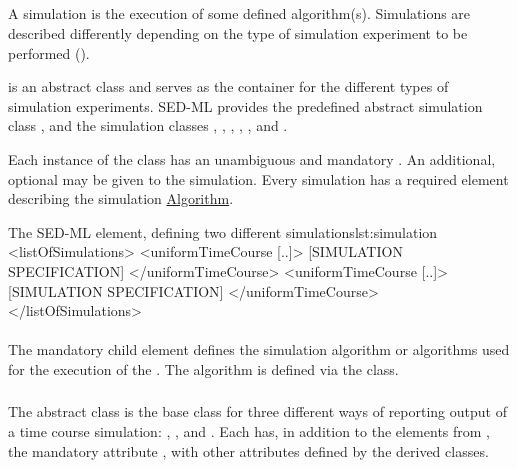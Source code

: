 \subsection{}
\label{class:simulation}
A simulation is the execution of some defined algorithm(s). Simulations are described differently depending on the type of simulation experiment to be performed (). 


\Simulation is an abstract class and serves as the container for the different types of simulation experiments. SED-ML \currentLV provides the predefined abstract simulation class \TimeCourse, and the simulation classes \UniformTimeCourse, \NonUniformTimeCourse, \SpecificTimeCourse, \OneStep, \SteadyState, and \Analysis. 

Each instance of the \Simulation class has an unambiguous and mandatory \hyperref[sec:id]{}. An additional, optional \hyperref[sec:name]{} may be given to the simulation. Every simulation has a required element \hyperref[class:algorithm]{} describing the simulation \hyperref[class:algorithm]{Algorithm}.

\begin{myXmlLst}{The SED-ML  element, defining two different \UniformTimeCourse simulations}{lst:simulation}
<listOfSimulations>
	<uniformTimeCourse [..]>
		[SIMULATION SPECIFICATION]
	</uniformTimeCourse>
	<uniformTimeCourse [..]>
		[SIMULATION SPECIFICATION]
	</uniformTimeCourse>
</listOfSimulations>
\end{myXmlLst}

\paragraph*{}
\label{sec:sim-algorithm}
The mandatory child  element defines the simulation algorithm or algorithms used for the execution of the \Simulation. The algorithm is defined via the \Algorithm class.

\begin{blockChanged}
\subsubsection{}
\label{class:timeCourse}
The abstract \TimeCourse class is the base class for three different ways of reporting output of a time course simulation: \UniformTimeCourse, \NonUniformTimeCourse, and \SpecificTimeCourse.  Each \TimeCourse has, in addition to the elements from \Simulation, the mandatory attribute \hyperref[sec:initialTime]{}, with other attributes defined by the derived classes.
\end{blockChanged}

